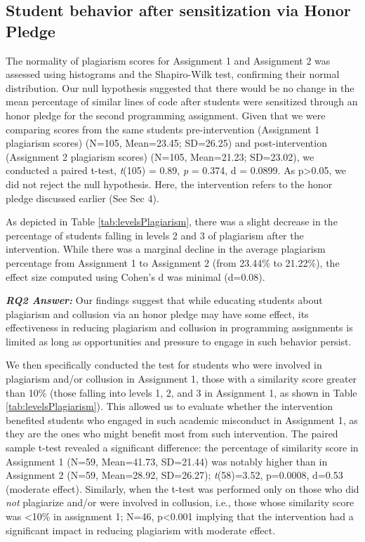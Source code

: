 \subsection{Student behavior after sensitization via Honor Pledge }

The normality of plagiarism scores for Assignment 1 and Assignment 2 was assessed using histograms and the Shapiro-Wilk test, confirming their normal distribution. Our null hypothesis suggested that there would be no change in the mean percentage of similar lines of code after students were sensitized through an honor pledge for the second programming assignment. Given that we were comparing scores from the same students pre-intervention (Assignment 1 plagiarism scores) (N=105, Mean=23.45; SD=26.25) and post-intervention (Assignment 2 plagiarism scores) (N=105, Mean=21.23; SD=23.02), we conducted a paired t-test, \textit{t}(105) = 0.89, \emph{p} = 0.374, d = 0.0899. As p>0.05, we did not reject the null hypothesis. Here, the intervention refers to the honor pledge discussed earlier (See Sec 4).

As depicted in Table \ref{tab:levelsPlagiarism}, there was a slight decrease in the percentage of students falling in levels 2 and 3 of plagiarism after the intervention. While there was a marginal decline in the average plagiarism percentage from Assignment 1 to Assignment 2 (from 23.44\% to 21.22\%), the effect size computed using Cohen's d was minimal (d=0.08). 

\vspace{4pt}
\begin{mdframed}
\textbf{\textit{RQ2 Answer:}} Our findings suggest that while educating students about plagiarism and collusion via an honor pledge may have some effect, its effectiveness in reducing plagiarism and collusion in programming assignments is limited as long as opportunities and pressure to engage in such behavior persist.
\end{mdframed}
\vspace{4pt}

We then specifically conducted the test for students who were involved in plagiarism and/or collusion in Assignment 1, those with a similarity score greater than 10\% (those falling into levels 1, 2, and 3 in Assignment 1, as shown in Table \ref{tab:levelsPlagiarism}). This allowed us to evaluate whether the intervention benefited students who engaged in such academic misconduct in Assignment 1, as they are the ones who might benefit most from such intervention. The paired sample t-test revealed a significant difference: the percentage of similarity score in Assignment 1 (N=59, Mean=41.73, SD=21.44) was notably higher than in Assignment 2 (N=59, Mean=28.92, SD=26.27); \textit{t}(58)=3.52, p=0.0008, d=0.53 (moderate effect). Similarly, when the t-test was performed only on those who did \emph{not} plagiarize and/or were involved in collusion, i.e., those whose similarity score was <10\% in assignment 1; N=46, p<0.001 implying that the intervention had a significant impact in reducing plagiarism with moderate effect.    

